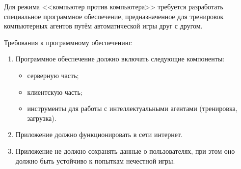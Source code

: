 Для режима <<компьютер против компьютера>> требуется разработать специальное программное обеспечение, предназначенное для тренировок компьютерных агентов путём автоматической игры друг с другом.

Требования к программному обеспечению:

\begin{enumerate}
    \item Программное обеспечение должно включать следующие компоненты:
    \begin{itemize}
        \item серверную часть;
        \item клиентскую часть;
        \item инструменты для работы с интеллектуальными агентами (тренировка, загрузка).
    \end{itemize}
    \item Приложение должно функционировать в сети интернет.
    \item Приложение не должно сохранять данные о пользователях, при этом оно должно быть устойчиво к попыткам нечестной игры.
\end{enumerate}

